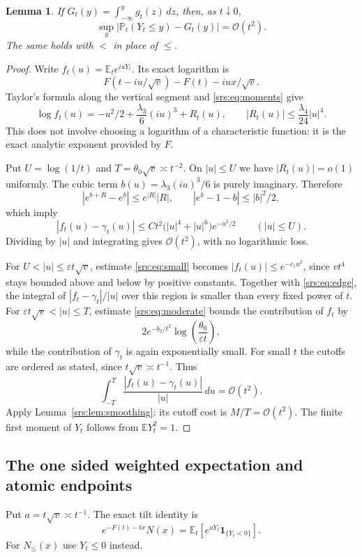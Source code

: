 \documentclass[11pt]{article}
\numberwithin{equation}{section}
\newtheorem{lemma}[theorem]{Lemma}
\theoremstyle{remark}\newtheorem{remark}[theorem]{Remark}
\newcommand{\Oh}{\mathcal O}
\newcommand{\E}{\mathbb E}
\newcommand{\Pp}{\mathbb P}
\begin{document}
\begin{lemma}\label{srs:lem:edgeworth}
If $G_t(y)=\int_{-\infty}^y g_t(z)\,dz$, then, as $t\downarrow0$,
\begin{equation}\label{srs:eq:cdf}
 \sup_y\left|\Pp_t(Y_t\le y)-G_t(y)\right|=\Oh(t^2).
\end{equation}
The same holds with $<$ in place of $\le$.
\end{lemma}
\begin{proof}
Write $f_t(u)=\E_t e^{iuY_t}$. Its exact logarithm is
\[
 F(t-iu/\sqrt v)-F(t)-iux/\sqrt v.
\]
Taylor's formula along the vertical segment and \eqref{srs:eq:moments} give
\begin{equation}\label{srs:eq:taylor}
 \log f_t(u)=-u^2/2+\frac{\lambda_3}{6}(iu)^3+R_t(u),
 \qquad |R_t(u)|\le\frac{\lambda_4}{24}|u|^4.
\end{equation}
This does not involve choosing a logarithm of a characteristic function: it is the exact analytic exponent provided by $F$.

Put $U=\log(1/t)$ and $T=\theta_0\sqrt v\asymp t^{-2}$. On $|u|\le U$ we have $|R_t(u)|=o(1)$ uniformly. The cubic term $b(u)=\lambda_3(iu)^3/6$ is purely imaginary. Therefore
\[
 |e^{b+R}-e^b|\le e^{|R|}|R|,\qquad
 |e^b-1-b|\le |b|^2/2,
\]
which imply
\begin{equation}\label{srs:eq:centralbound}
 |f_t(u)-\gamma_t(u)|
 \le C t^2\bigl(|u|^4+|u|^6\bigr)e^{-u^2/2}
 \qquad(|u|\le U).
\end{equation}
Dividing by $|u|$ and integrating gives $\Oh(t^2)$, with no logarithmic loss.

For $U<|u|\le\varepsilon t\sqrt v$, estimate \eqref{srs:eq:small} becomes $|f_t(u)|\le e^{-c_1u^2}$, since $vt^4$ stays bounded above and below by positive constants. Together with \eqref{srs:eq:edge}, the integral of $|f_t-\gamma_t|/|u|$ over this region is smaller than every fixed power of $t$. For $\varepsilon t\sqrt v<|u|\le T$, estimate \eqref{srs:eq:moderate} bounds the contribution of $f_t$ by
\[
 2e^{-b_2/t^2}\log\left(\frac{\theta_0}{\varepsilon t}\right),
\]
while the contribution of $\gamma_t$ is again exponentially small. For small $t$ the cutoffs are ordered as stated, since $t\sqrt v\asymp t^{-1}$. Thus
\[
 \int_{-T}^T\frac{|f_t(u)-\gamma_t(u)|}{|u|}\,du=\Oh(t^2).
\]
Apply Lemma~\ref{srs:lem:smoothing}: its cutoff cost is $M/T=\Oh(t^2)$. The finite first moment of $Y_t$ follows from $\E Y_t^2=1$.
\end{proof}

\subsection{The one sided weighted expectation and atomic endpoints}
Put $a=t\sqrt v\asymp t^{-1}$. The exact tilt identity is
\begin{equation}\label{srs:eq:tilt}
 e^{-F(t)-tx}N(x)=\E_t[e^{aY_t}\mathbf 1_{\{Y_t<0\}}].
\end{equation}
For $N_{\le}(x)$ use $Y_t\le0$ instead.
\end{document}
